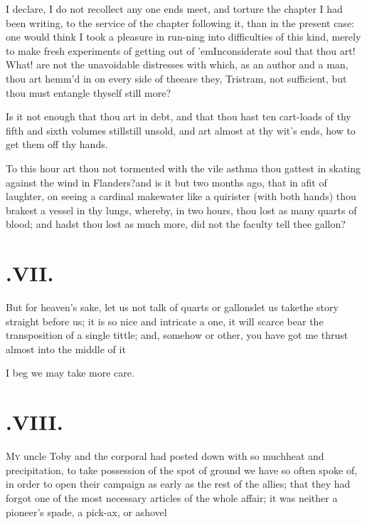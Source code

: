 \documentclass{article}
\begin{document}
I declare, I do not recollect any one\break
{} 
ends meet, and torture the chapter I had been writing, to the
service of the chapter following it, than in the present case:
one would think I took a pleasure in run-\pb ning into
difficulties of this kind, merely to make fresh experiments of
getting out of ’em\tsh Inconsiderate soul that thou art! What!
are not the unavoidable distresses with which, as an author and
a man, thou art hemm’d in on every side of thee\tsh are they,
Tristram, not sufficient, but thou must entangle thyself still
more?


Is it not enough that thou art in debt, and that thou hast ten
cart-loads of thy fifth and sixth volumes still\tsk still
unsold, and art almost at thy wit’s ends, how to get them off
thy hands.


To this hour art thou not tormented with the vile asthma
thou gattest in skating against the wind in Flanders?\break and is
it but two months ago, that in a\pb fit of laughter, on seeing a
cardinal make\break water like a quirister (with both hands) thou brakest
a vessel in thy lungs, where\-by, in two hours, thou lost as many
quarts of blood; and hadst thou lost as much more, did not the
faculty tell thee\break
{}
gallon?\tsh

\section{.\enspace VII.}

\quad\tsk But for heaven’s sake, let us not talk of quarts or
gallons\tsh let us take\break the story straight before us; it
is so nice and intricate a one, it will scarce bear the
transposition of a single tittle; and, somehow or other, you have
got me thrust almost into the middle of it\tsh

\tsh I beg we may take more care.

\section{.\enspace VIII.}

\lettrine{M}{y} uncle Toby and the corporal
had posted down with so much\break heat and precipitation, to take
possession of the spot of ground we have so often spoke of, in
order to open their campaign as early as the rest of the allies;
that they had forgot one of the most necessary articles of the
whole affair; it was neither a pioneer’s spade, a pick-ax, or
a\break shovel\tsk
\end{document}
